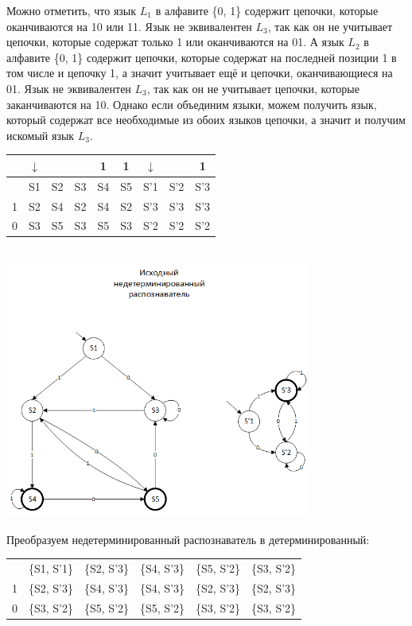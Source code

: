 \documentclass[a4paper,14pt]{extarticle}
\begin{document}
\begin{enumerate}[1.]
Можно отметить, что язык $L_1$ в алфавите \{0, 1\} содержит цепочки, которые оканчиваются на 10 или 11.
Язык не эквивалентен $L_3$, так как он не учитывает цепочки, которые содержат только 1 или оканчиваются на 01.  
А язык $L_2$ в алфавите \{0, 1\} содержит цепочки, которые содержат на последней позиции 1 в том числе и 
цепочку 1, а значит учитывает ещё и цепочки, оканчивающиеся на 01. 
Язык не эквивалентен $L_3$, так как он не учитывает цепочки, которые заканчиваются на 10.
Однако если объединим языки, можем получить язык, который содержат все необходимые из обоих языков цепочки, 
а значит и получим искомый язык $L_3$.\\


\begin{tabular}{|c|c|c|c|c|c|c|c|c|}
    \hline
& $\downarrow$ &  &  & 1 & 1 & $\downarrow$ & & 1\\
\hline
& S1 & S2 & S3 & S4 & S5 & S'1 & S'2 & S'3\\
\hline
1 & S2 & S4 & S2 & S4 & S2 & S'3 & S'3 & S'3 \\
\hline
0 & S3 & S5 & S3 & S5 & S3 & S'2 & S'2 & S'2 \\
\hline
\end{tabular}\\
\includegraphics[width=100mm]{task3_new_non_determined}

Преобразуем недетерминированный распознаватель в детерминированный:\\

\begin{tabular}{|c|c|c|c|c|c|}
    \hline
& &  & &&\\
\hline
  & \{S1, S'1\} & \{S2, S'3\} & \{S4, S'3\} & \{S5, S'2\} & \{S3, S'2\}\\
\hline
1 & \{S2, S'3\} & \{S4, S'3\} & \{S4, S'3\} & \{S2, S'3\} & \{S2, S'3\}\\
\hline
0 & \{S3, S'2\} & \{S5, S'2\} & \{S5, S'2\} & \{S3, S'2\} & \{S3, S'2\}\\
\hline
\end{tabular}\\


\end{enumerate}
\end{document}
